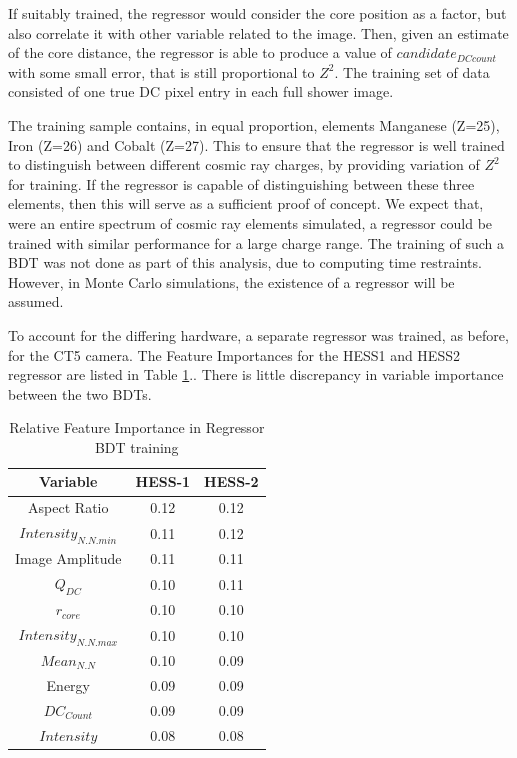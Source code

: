 \documentclass[11pt]{article}
\begin{document}
If suitably trained, the regressor would consider the core position as a factor, but also correlate it with other variable related to the image. Then, given an estimate of the core distance, the regressor is able to produce a value of $candidate_{DC count}$ with some small error, that is still proportional to $Z^{2}$. The training set of data consisted of one true DC pixel entry in each full shower image. 

The training sample contains, in equal proportion, elements Manganese (Z=25), Iron (Z=26) and Cobalt (Z=27). This to ensure that the regressor is well trained to distinguish between different cosmic ray charges, by providing variation of $Z^{2}$ for training. If the regressor is capable of distinguishing between these three elements, then this will serve as a sufficient proof of concept. We expect that, were an entire spectrum of cosmic ray elements simulated, a regressor could be trained with similar performance for a large charge range. The training of such a BDT was not done as part of this analysis, due to computing time restraints. However, in Monte Carlo simulations, the existence of a regressor will be assumed.

To account for the differing hardware, a separate regressor was trained, as before, for the CT5 camera. The Feature Importances for the HESS1 and HESS2 regressor are listed in Table \ref{tab:regressor}.. There is little discrepancy in variable importance between the two BDTs.

\begin{table}[h!]
  \centering
  \caption{Relative Feature Importance in  Regressor BDT training}
  \label{tab:regressor}
  \begin{tabular}{ccc}
    \toprule
    Variable & HESS-1 & HESS-2 \\
    \midrule
    Aspect Ratio & 0.12 & 0.12\\
    $Intensity_{N.N.min}$ & 0.11 & 0.12\\
    Image Amplitude & 0.11 & 0.11\\
    $Q_{DC}$ & 0.10 & 0.11\\
    $r_{core}$ & 0.10 & 0.10\\
    $Intensity_{N.N.max}$ & 0.10 & 0.10\\
    $Mean_{N.N}$ & 0.10 & 0.09\\
    Energy & 0.09 & 0.09\\
    $DC_{Count}$ & 0.09 & 0.09\\
    $Intensity$ & 0.08 & 0.08\\
    \bottomrule
  \end{tabular}
\end{table}
\end{document}
